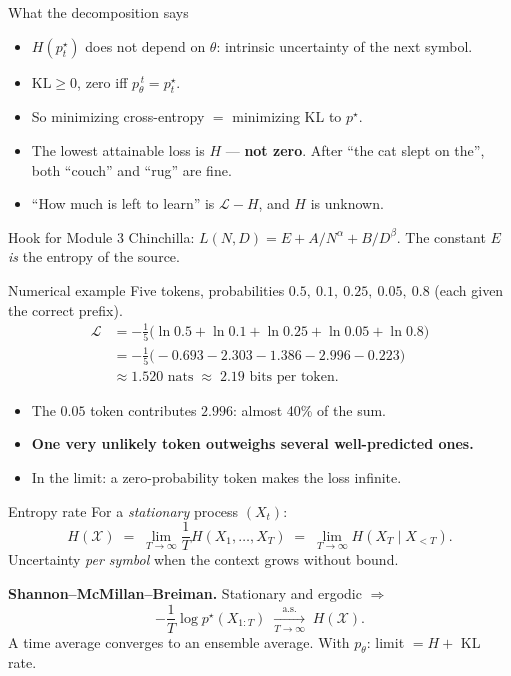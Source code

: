 \documentclass[11pt,aspectratio=169]{beamer}
\newcommand{\Lc}{\mathcal{L}}
\newcommand{\KL}{\mathrm{KL}}
\newcommand{\pstar}{p^{\star}}
\newcommand{\ptheta}{p_{\theta}}
\newcommand{\dest}[1]{\textcolor{structure}{\textbf{#1}}}
\begin{document}
\begin{frame}{What the decomposition says}
  \begin{itemize}
    \item $H(\pstar_t)$ does not depend on $\theta$: intrinsic uncertainty of the next
          symbol.
    \item $\KL\ge 0$, zero iff $\ptheta^{\,t} = \pstar_t$.
    \item So minimizing cross-entropy $=$ minimizing KL to $\pstar$.
    \item The lowest attainable loss is $H$ --- \dest{not zero}. After ``the cat slept on
          the'', both ``couch'' and ``rug'' are fine.
    \item ``How much is left to learn'' is $\Lc - H$, and $H$ is unknown.
  \end{itemize}

  \vspace{0.8em}
  \begin{block}{Hook for Module 3}
    Chinchilla: $L(N,D) = E + A/N^{\alpha} + B/D^{\beta}$. The constant $E$ \emph{is} the
    entropy of the source.
  \end{block}
\end{frame}

\begin{frame}{Numerical example}
  Five tokens, probabilities $0.5,\ 0.1,\ 0.25,\ 0.05,\ 0.8$ (each given the correct prefix).
  \begin{align*}
    \Lc &= -\tfrac{1}{5}\big(\ln 0.5 + \ln 0.1 + \ln 0.25 + \ln 0.05 + \ln 0.8\big) \\
        &= -\tfrac{1}{5}\big(-0.693 - 2.303 - 1.386 - 2.996 - 0.223\big) \\
        &\approx 1.520 \text{ nats} \;\approx\; 2.19 \text{ bits per token.}
  \end{align*}

  \vspace{0.8em}
  \begin{itemize}
    \item The $0.05$ token contributes $2.996$: almost 40\% of the sum.
    \item \dest{One very unlikely token outweighs several well-predicted ones.}
    \item In the limit: a zero-probability token makes the loss infinite.
  \end{itemize}
\end{frame}

\begin{frame}{Entropy rate}
  For a \emph{stationary} process $(X_t)$:
  \[
    H(\mathcal{X}) \;=\; \lim_{T\to\infty}\frac{1}{T}H(X_1,\dots,X_T)
    \;=\; \lim_{T\to\infty}H(X_T\mid X_{<T}).
  \]
  Uncertainty \emph{per symbol} when the context grows without bound.

  \vspace{1em}
  \textbf{Shannon--McMillan--Breiman.} Stationary and ergodic $\Rightarrow$
  \[
    -\frac{1}{T}\log\pstar(X_{1:T}) \;\xrightarrow[T\to\infty]{\text{a.s.}}\; H(\mathcal{X}).
  \]
  A time average converges to an ensemble average. With $\ptheta$: limit $= H +$ KL rate.
\end{frame}
\end{document}
